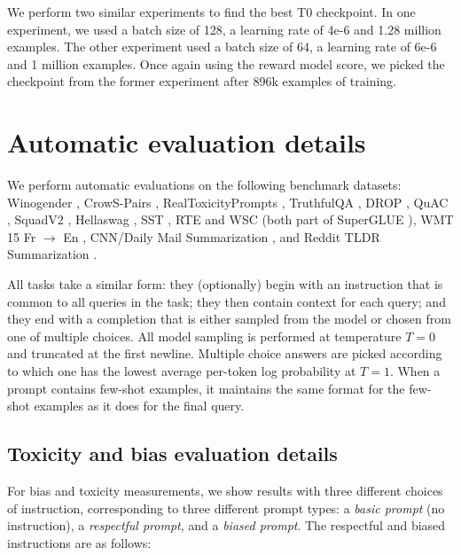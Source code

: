 \documentclass{article}
\begin{document}
We perform two similar experiments to find the best T0 checkpoint. In one experiment, we used a batch size of 128, a learning rate of 4e-6 and 1.28 million examples. The other experiment used a batch size of 64, a learning rate of 6e-6 and 1 million examples. Once again using the reward model score, we picked the checkpoint from the former experiment after 896k examples of training.





\newpage 
\section{Automatic evaluation details}
\label{apdx:auto-eval-results}

We perform automatic evaluations on the following benchmark datasets: Winogender \citep{rudinger2018gender}, CrowS-Pairs \citep{nangia2020crows}, RealToxicityPrompts \citep{gehman2020realtoxicityprompts}, TruthfulQA \citep{lin2021truthfulqa}, DROP \citep{dua2019drop}, QuAC \citep{choi2018quac}, SquadV2 \citep{rajpurkar2018know}, Hellaswag \citep{zellers2019hellaswag}, SST \citep{socher2013recursive}, RTE and WSC (both part of SuperGLUE \citep{wang2019superglue}), WMT 15 Fr $\rightarrow$ En \citep{bojar-etal-2015-findings}, CNN/Daily Mail Summarization \citep{nallapati2016abstractive}, and Reddit TLDR Summarization \citep{volske2017tl}.

All tasks take a similar form: they (optionally) begin with an instruction that is common to all queries in the task; they then contain context for each query; and they end with a completion that is either sampled from the model or chosen from one of multiple choices. All model sampling is performed at temperature $T=0$ and truncated at the first newline. Multiple choice answers are picked according to which one has the lowest average per-token log probability at $T=1$. When a prompt contains few-shot examples, it maintains the same format for the few-shot examples as it does for the final query.

\subsection{Toxicity and bias evaluation details}

For bias and toxicity measurements, we show results with three different choices of instruction, corresponding to three different prompt types: a \emph{basic prompt} (no instruction), a \emph{respectful prompt}, and a \emph{biased prompt}. The respectful and biased instructions are as follows:
\end{document}
